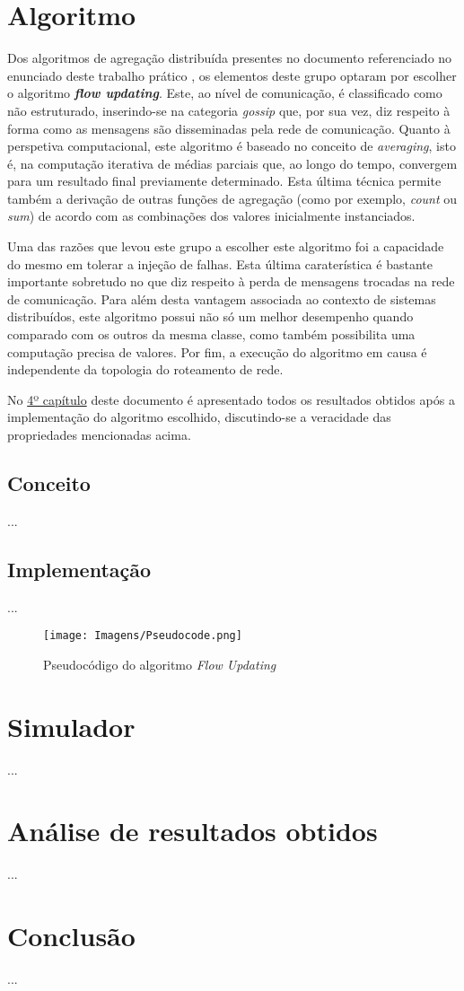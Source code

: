 \documentclass[a4paper]{article}
\begin{document}
\section{Algoritmo} \label{sec:Algorithm}
\large{
	Dos algoritmos de agregação distribuída presentes no documento referenciado no enunciado deste trabalho prático \parencite{article}, os elementos deste grupo optaram por escolher o algoritmo \textbf{\textit{flow updating}}.
	Este, ao nível de comunicação, é classificado como não estruturado, inserindo-se na categoria \textit{gossip} que, por sua vez, diz respeito à forma como as mensagens são disseminadas pela rede de comunicação.
	Quanto à perspetiva computacional, este algoritmo é baseado no conceito de \textit{averaging}, isto é, na computação iterativa de médias parciais que, ao longo do tempo, convergem para um resultado final previamente determinado.
	Esta última técnica permite também a derivação de outras funções de agregação (como por exemplo, \textit{count} ou \textit{sum}) de acordo com as combinações dos valores inicialmente instanciados.

	Uma das razões que levou este grupo a escolher este algoritmo foi a capacidade do mesmo em tolerar a injeção de falhas. Esta última caraterística é bastante importante sobretudo no que diz respeito à perda de mensagens trocadas na rede de comunicação.
	Para além desta vantagem associada ao contexto de sistemas distribuídos, este algoritmo possui não só um melhor desempenho quando comparado com os outros da mesma classe, como também possibilita uma computação precisa de valores.
	Por fim, a execução do algoritmo em causa é independente da topologia do roteamento de rede.

	No \hyperref[sec:Analysis of results]{4º capítulo} deste documento é apresentado todos os resultados obtidos após a implementação do algoritmo escolhido, discutindo-se a veracidade das propriedades mencionadas acima.

	\subsection{Conceito} \label{subsec:Concept}
	...

	\subsection{Implementação} \label{subsec:Implementation}
	...

	\begin{figure}[H]
		\centering
		\texttt{[image: Imagens/Pseudocode.png]}
		\caption{Pseudocódigo do algoritmo \textit{Flow Updating}}
		\label{fig:1}
	\end{figure}
}

\section{Simulador} \label{sec:Simulator}
\large{
	...
}

\section{Análise de resultados obtidos} \label{sec:Analysis of results}
\large{
	...
}

\section{Conclusão} \label{sec:Conclusion}
\large{
	...
}

\printbibliography[heading=bibintoc]
\end{document}
